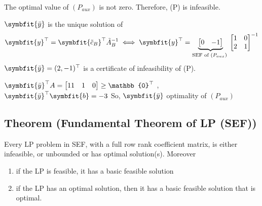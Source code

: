 The optimal value of $ (P_{aux}) $ is not zero. Therefore, (P) is
infeasible.

$ \symbfit{\bar{y}} $ is the unique solution of 
\[ \symbfit{y}^\top =\symbfit{\tilde{c}_B}^\top\tilde{A}_B^{-1} \iff 
\symbfit{y}^\top
=
\underbrace{\begin{bmatrix}0 & -1\end{bmatrix}}_
    {\text{SEF of $ (P_{aux}) $ }}
\begin{bmatrix}
    1 & 0\\
    2 & 1
\end{bmatrix}^{-1}
\]
$ \symbfit{\bar{y}}=(2,-1)^\top $
is a certificate of infeasibility of (P).

$ \symbfit{\bar{y}}^\top  A 
= \begin{bmatrix}11 & 1 & 0 \end{bmatrix}\ge \mathbb{0}^\top $ ,
$ \symbfit{\bar{y}}^\top \symbfit{b}=-3 $
So, $ \symbfit{\bar{y}} $ optimality of $ (P_{aux}) $

\subsection{Theorem (Fundamental Theorem of LP (SEF))}
Every LP problem in SEF, with a full row rank coefficient
matrix, is either infeasible, or unbounded or has
optimal solution(s). Moreover
\begin{enumerate}[(1)]
    \item if the LP is feasible, it has a basic feasible solution
    \item if the LP has an optimal solution, then it has
    a basic feasible solution that is optimal.
\end{enumerate}